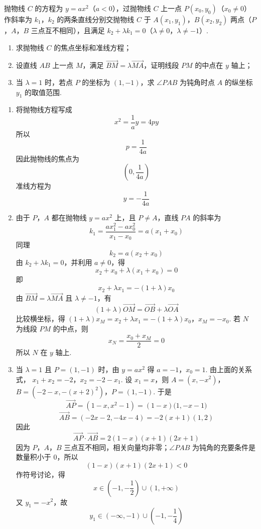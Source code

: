 \begin{problem}
抛物线 \(C\) 的方程为 \( y = ax^{2} \)（\(a < 0\)），过抛物线 \(C\) 上一点 \( P(x_{0}, y_{0}) \)（\(x_{0} \neq 0\)）作斜率为 \(k_{1}\)，\(k_{2}\) 的两条直线分别交抛物线 \(C\) 于 \(A(x_{1}, y_{1})\)，\(B(x_{2}, y_{2})\) 两点（\(P\)，\(A\)，\(B\) 三点互不相同），且满足 \( k_{2} + \lambda k_{1} = 0 \)（\(\lambda \neq 0\)，\(\lambda \neq -1\)）.
\begin{enumerate}
\item 求抛物线 \(C\) 的焦点坐标和准线方程；
\item 设直线 \(AB\) 上一点 \(M\)，满足 \(\overrightarrow{BM} = \lambda \overrightarrow{MA}\)，证明线段 \(PM\) 的中点在 \(y\) 轴上；
\item 当 \(\lambda = 1\) 时，若点 \(P\) 的坐标为 \((1, -1)\)，求 \(\angle PAB\) 为钝角时点 \(A\) 的纵坐标 \(y_{1}\) 的取值范围.
\end{enumerate}
\end{problem}

\begin{solution}
\begin{enumerate}
\item 将抛物线方程写成
\[
x^2=\frac{1}{a}y=4py
\]
所以
\[
p=\frac{1}{4a}
\]
因此抛物线的焦点为
\[
\left(0,\frac{1}{4a}\right)
\]
准线方程为
\[
y=-\frac{1}{4a}
\]

\item 由于 \(P\)，\(A\) 都在抛物线 \(y=ax^2\) 上，且 \(P\ne A\)，直线 \(PA\) 的斜率为
\[
k_1=\frac{ax_1^2-ax_0^2}{x_1-x_0}=a(x_1+x_0)
\]
同理
\[
k_2=a(x_2+x_0)
\]
由 \(k_2+\lambda k_1=0\)，并利用 \(a\ne0\)，得
\[
x_2+x_0+\lambda(x_1+x_0)=0
\]
即
\[
x_2+\lambda x_1=-(1+\lambda)x_0
\]
由 \(\overrightarrow{BM}=\lambda\overrightarrow{MA}\) 且 \(\lambda\ne-1\)，有
\[
(1+\lambda)\overrightarrow{OM}
=\overrightarrow{OB}+\lambda\overrightarrow{OA}
\]
比较横坐标，得
\((1+\lambda)x_M=x_2+\lambda x_1=-(1+\lambda)x_0\)，\(x_M=-x_0\).
若 \(N\) 为线段 \(PM\) 的中点，则
\[
x_N=\frac{x_0+x_M}{2}=0
\]
所以 \(N\) 在 \(y\) 轴上.

\item 当 \(\lambda=1\) 且 \(P=(1,-1)\) 时，由 \(y=ax^2\) 得 \(a=-1\)，\(x_0=1\). 由上面的关系式，
\(x_1+x_2=-2\)，\(x_2=-2-x_1\).
设 \(x_1=x\)，则
\(A=(x,-x^2)\)，\(B=(-2-x,-(x+2)^2)\)，\(P=(1,-1)\).
于是
\[
\overrightarrow{AP}
=(1-x,x^2-1)
=(1-x)\bigl(1,-x-1\bigr)
\]
\[
\overrightarrow{AB}
=(-2x-2,-4x-4)
=-2(x+1)(1,2)
\]
因此
\[
\overrightarrow{AP}\cdot\overrightarrow{AB}
=2(1-x)(x+1)(2x+1)
\]
因为 \(P\)，\(A\)，\(B\) 三点互不相同，相关向量均非零；\(\angle PAB\) 为钝角的充要条件是数量积小于 \(0\)，所以
\[
(1-x)(x+1)(2x+1)<0
\]
作符号讨论，得
\[
x\in\left(-1,-\frac12\right)\cup(1,+\infty)
\]
又 \(y_1=-x^2\)，故
\[
y_1\in(-\infty,-1)\cup\left(-1,-\frac14\right)
\]
\end{enumerate}
\end{solution}
